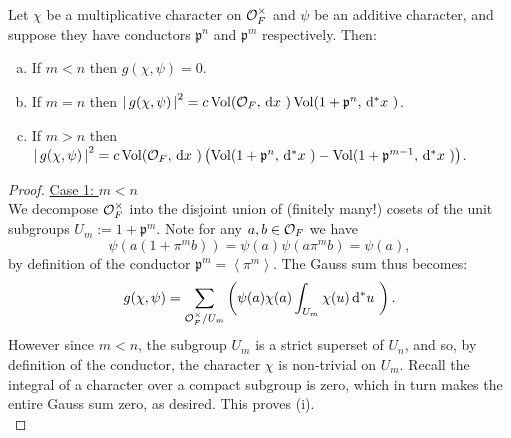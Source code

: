 \documentclass[11pt, x11names, openany]{book}
\newcommand{\pp}{\mathfrak{p}}
\newcommand{\brangle}[1]{\left\langle #1 \right\rangle}
\renewcommand{\brack}[1]{\left(   #1 \right)}
\newcommand{\abs}[1]{\left| \, #1  \,\right|}
\newcommand{\dx}{\, \mathrm{d}x \ }
\renewcommand{\d}[1]{\, \mathrm{d}#1 \ }
\DeclareMathOperator{\vol}{Vol}
\begin{document}
\begin{lemma}
\label{lemma: gauss-sum conductor relations}
Let $\chi$ be a multiplicative character on $\mathcal{O}_F^\times$ and $\psi$ be an additive character, and suppose they have conductors $\pp^n$ and $\pp^m$ respectively. Then:
\begin{enumerate}[(a)]
    \item If $m < n$ then $g(\chi, \psi) = 0$.
    \item If $m = n$ then $\abs{g(\chi, \psi)}^2 = c \vol(\calo_F, \dx) \vol(1 + \pp^n, \d{^*x})$.
    \item If $m > n$ then $\abs{g(\chi, \psi)}^2 = c \vol(\calo_F, \dx) \brack{\vol(1 + \pp^n, \d{^*x}) - \vol(1 + \pp^{m-1}, \d{^*x})}$.
\end{enumerate}
\end{lemma}
\begin{proof}
\underline{Case 1: $m < n$}\\
We decompose $\mathcal{O}_F^\times$ into the disjoint union of (finitely many!) cosets of the unit subgroups $U_m := 1 + \pp^m$. Note for any $a, b \in \mathcal{O}_F$ we have
\begin{equation*}
    \psi(a(1 + \pi^m b)) = \psi(a) \psi(a\pi^m b) = \psi(a),
\end{equation*}
by definition of the conductor $\pp^m = \brangle{\pi^m}$. The Gauss sum thus becomes:
\begin{equation*}
    g(\chi, \psi) = \sum_{\calo_F^\times/U_m} \brack{\psi(a) \chi(a) \int_{U_m} \chi(u) \d{^*u}}.
\end{equation*}
However since $m < n$, the subgroup $U_m$ is a strict superset of $U_n$, and so, by definition of the conductor, the character $\chi$ is non-trivial on $U_m$. Recall the integral of a character over a compact subgroup is zero, which in turn makes the entire Gauss sum zero, as desired. This proves (i).\\


\end{proof}
\end{document}

